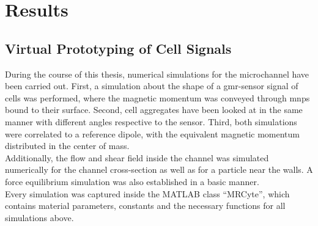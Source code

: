 \chapter{Results}
\section{Virtual Prototyping of Cell Signals}

During the course of this thesis, numerical simulations for the microchannel have been carried out. First, a simulation about the shape of a \gls{gmr}-sensor signal of cells was performed, where the magnetic momentum was conveyed through \glspl{mnp} bound to their surface. Second, cell aggregates have been looked at in the same manner with different angles respective to the sensor. Third, both simulations were correlated to a reference dipole, with the equivalent magnetic momentum distributed in the center of mass.\\
Additionally, the flow and shear field inside the channel was simulated numerically for the channel cross-section as well as for a particle near the walls. A force equilibrium simulation was also established in a basic manner. \\
Every simulation was captured inside the MATLAB class ``MRCyte'', which contains material parameters, constants and the necessary functions for all simulations above.
